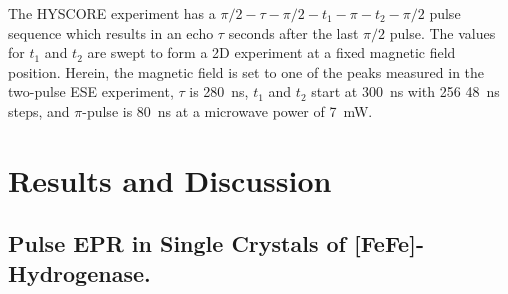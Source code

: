 The HYSCORE experiment has a ${\pi/2\!-\!\tau\!-\!\pi/2\!-\!t_1\!-\!\pi\!-\!t_2\!-\!\pi/2}$ pulse sequence which results in an echo $\tau$ seconds after the last $\pi/2$ pulse. The values for $t_1$ and $t_2$ are swept to form a 2D experiment at a fixed magnetic field position. Herein, the magnetic field is set to one of the peaks measured in the two-pulse ESE experiment, $\tau$ is 280~ns, $t_1$ and $t_2$ start at 300~ns with 256 48~ns steps, and $\pi$-pulse is 80~ns at a microwave power of 7~mW. 

\section{Results and Discussion}
\subsection{Pulse EPR in Single Crystals of [FeFe]-Hydrogenase.}
